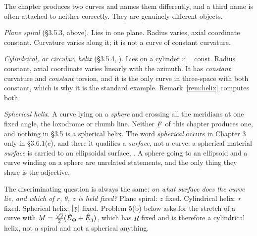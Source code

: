 \begin{remark}\label{rem:threecurves}
The chapter produces two curves and names them differently, and a third
name is often attached to neither correctly. They are genuinely different
objects.

\smallskip\noindent
\emph{Plane spiral} (\S3.5.3, above). Lies in one plane. Radius varies,
axial coordinate constant. Curvature varies along it; it is not a curve of
constant curvature.

\smallskip\noindent
\emph{Cylindrical, or circular, helix} (\S3.5.4, ). Lies on a
cylinder $r=\text{const}$. Radius constant, axial coordinate varies
linearly with the azimuth. It has \emph{constant} curvature and
\emph{constant} torsion, and it is the only curve in three-space with both
constant, which is why it is the standard example. Remark~\ref{rem:helix}
computes both.

\smallskip\noindent
\emph{Spherical helix.} A curve lying on a \emph{sphere} and crossing all
the meridians at one fixed angle, the loxodrome or rhumb line. Neither
$\bF$ of this chapter produces one, and nothing in \S3.5 is a spherical
helix. The word \emph{spherical} occurs in Chapter 3 only in \S3.6.1(c),
and there it qualifies a \emph{surface}, not a curve: a spherical material
\emph{surface} is carried to an ellipsoidal surface, . A sphere
going to an ellipsoid and a curve winding on a sphere are unrelated
statements, and the only thing they share is the adjective.

\smallskip\noindent
The discriminating question is always the same: \emph{on what surface does
the curve lie, and which of $r$, $\theta$, $z$ is held fixed?} Plane
spiral: $z$ fixed. Cylindrical helix: $r$ fixed. Spherical helix:
$|\bx|$ fixed. Problem 5(b) below asks for the stretch of a curve with
$\bM=\tfrac{\sqrt2}{2}(\hETh+\hbE_{3})$, which has $R$ fixed and is
therefore a cylindrical helix, not a spiral and not a spherical anything.
\end{remark}

